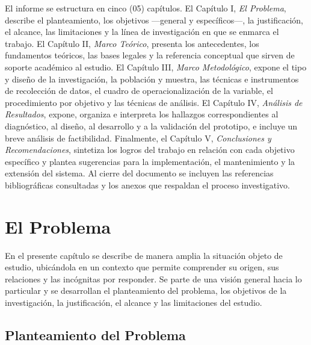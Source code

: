 \documentclass[12pt, letterpaper]{report}
\begin{document}
El informe se estructura en cinco (05) capítulos. El Capítulo I,
\textit{El Problema}, describe el planteamiento, los objetivos
---general y específicos---, la justificación, el alcance, las
limitaciones y la línea de investigación en que se enmarca el trabajo.
El Capítulo II, \textit{Marco Teórico}, presenta los antecedentes, los
fundamentos teóricos, las bases legales y la referencia conceptual que
sirven de soporte académico al estudio. El Capítulo III, \textit{Marco
Metodológico}, expone el tipo y diseño de la investigación, la
población y muestra, las técnicas e instrumentos de recolección de
datos, el cuadro de operacionalización de la variable, el
procedimiento por objetivo y las técnicas de análisis. El Capítulo IV,
\textit{Análisis de Resultados}, expone, organiza e interpreta los
hallazgos correspondientes al diagnóstico, al diseño, al desarrollo y
a la validación del prototipo, e incluye un breve análisis de
factibilidad. Finalmente, el Capítulo V, \textit{Conclusiones y
Recomendaciones}, sintetiza los logros del trabajo en relación con
cada objetivo específico y plantea sugerencias para la implementación,
el mantenimiento y la extensión del sistema. Al cierre del documento
se incluyen las referencias bibliográficas consultadas y los anexos
que respaldan el proceso investigativo.



\chapter{El Problema}

En el presente capítulo se describe de manera amplia la situación
objeto de estudio, ubicándola en un contexto que permite comprender
su origen, sus relaciones y las incógnitas por responder. Se parte de
una visión general hacia lo particular y se desarrollan el
planteamiento del problema, los objetivos de la investigación, la
justificación, el alcance y las limitaciones del estudio.

\section{Planteamiento del Problema}
\end{document}
